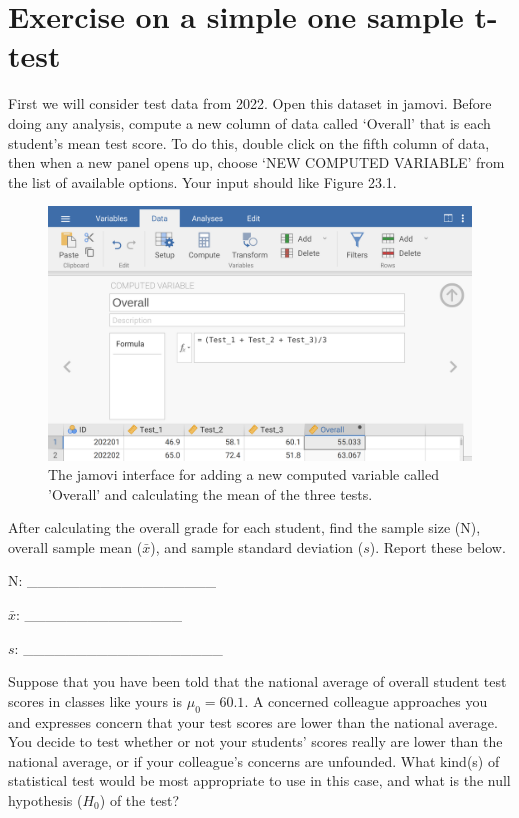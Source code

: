 \documentclass[
  openany]{krantz}
\begin{document}
\hypertarget{exercise-on-a-simple-one-sample-t-test}{%
\section{Exercise on a simple one sample t-test}\label{exercise-on-a-simple-one-sample-t-test}}

First we will consider test data from 2022.
Open this dataset in jamovi.
Before doing any analysis, compute a new column of data called `Overall' that is each student's mean test score.
To do this, double click on the fifth column of data, then when a new panel opens up, choose `NEW COMPUTED VARIABLE' from the list of available options.
Your input should like Figure 23.1.

\begin{figure}
\includegraphics[width=1\linewidth]{img/jamovi_students_overall} \caption{The jamovi interface for adding a new computed variable called 'Overall' and calculating the mean of the three tests.}\label{fig:unnamed-chunk-89}
\end{figure}

After calculating the overall grade for each student, find the sample size (N), overall sample mean (\(\bar{x}\)), and sample standard deviation (\(s\)).
Report these below.

N: \_\_\_\_\_\_\_\_\_\_\_\_\_\_\_\_\_\_

\(\bar{x}\): \_\_\_\_\_\_\_\_\_\_\_\_\_\_\_

\(s\): \_\_\_\_\_\_\_\_\_\_\_\_\_\_\_\_\_\_\_

Suppose that you have been told that the national average of overall student test scores in classes like yours is \(\mu_{0} = 60.1\).
A concerned colleague approaches you and expresses concern that your test scores are lower than the national average.
You decide to test whether or not your students' scores really are lower than the national average, or if your colleague's concerns are unfounded.
What kind(s) of statistical test would be most appropriate to use in this case, and what is the null hypothesis (\(H_{0}\)) of the test?
\end{document}
